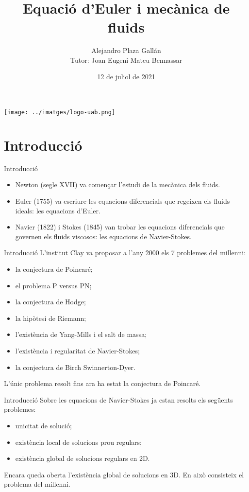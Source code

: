 \documentclass{beamer}
\title[Equaci\'{o} d'Euler]{{\textbf{Equaci\'{o} d'Euler i mec\`{a}nica de fluids}}}
\author[Alejandro Plaza Gall\'{a}n]{\huge{Alejandro Plaza Gall\'{a}n}\\\vspace{2mm}\Large{Tutor: Joan Eugeni Mateu Bennassar}}
\date{12 de juliol de 2021}
\begin{document}
\begin{frame}
\titlepage
\centering
\texttt{[image: ../imatges/logo-uab.png]}\par\vspace{1cm}
\end{frame}

\section{Introducci\'{o}}
\begin{frame}{Introducci\'{o}}
\begin{itemize}
\item Newton (segle XVII) va comen\c{c}ar l'estudi de la mec\`{a}nica dels fluids.
\pause
\item Euler (1755) va escriure les equacions diferencials que regeixen els fluids ideals: les equacions d'Euler.
\pause
\item Navier (1822) i Stokes (1845) van trobar les equacions diferencials que governen els fluids viscosos: les equacions de Navier-Stokes.
\end{itemize}
\end{frame}

\begin{frame}{Introducci\'{o}}
L'institut Clay va proposar a l'any 2000 els 7 problemes del mil\textperiodcentered lenni:
\pause
\begin{itemize}
\item la conjectura de Poincar\'{e};
\item el problema P versus PN;
\item la conjectura de Hodge;
\item la hip\`{o}tesi de Riemann;
\item l'exist\`{e}ncia de Yang-Mills i el salt de massa;
\item l'exist\`{e}ncia i regularitat de Navier-Stokes;
\item la conjectura de Birch Swinnerton-Dyer.
\end{itemize}
\pause
L'\'{u}nic problema resolt fins ara ha estat la conjectura de Poincar\'{e}.
\end{frame}

\begin{frame}{Introducci\'{o}}
Sobre les equacions de Navier-Stokes ja estan resolts els seg\"{u}ents problemes:
\pause
\begin{itemize}
\item unicitat de soluci\'{o};
\pause
\item exist\`{e}ncia local de solucions prou regulars;
\pause
\item exist\`{e}ncia global de solucions regulars en 2D.
\pause
\end{itemize}
Encara queda oberta l'exist\`{e}ncia global de solucions en 3D. En aix\`{o} consisteix el problema del mil\textperiodcentered lenni.
\end{frame}
\end{document}
